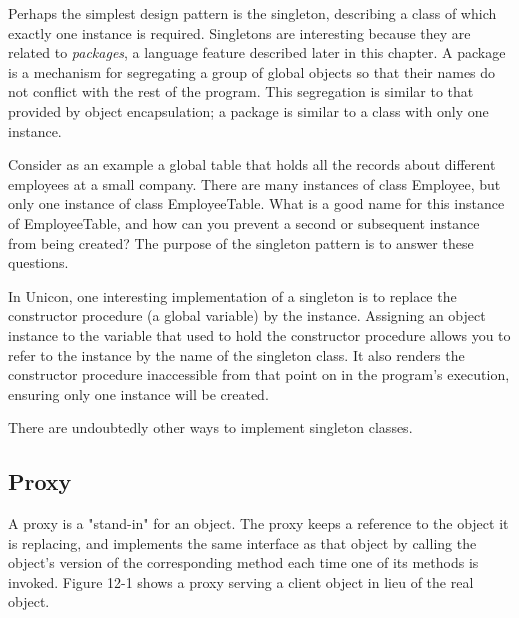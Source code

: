 Perhaps the simplest design pattern is the singleton,
describing a class of which exactly one instance
is required. Singletons are interesting because they are related to
\textit{packages}, a language feature described later in this chapter.
A package is a mechanism for segregating a group of
global objects so that their names do not conflict with the rest of the
program. This segregation is similar to that provided by object
encapsulation; a package is similar to a class with only one instance.

Consider as an example a global table that holds all the records about
different employees at a small company. There are many instances of
class \textsf{Employee}, but only one instance of class
\textsf{EmployeeTable}. What is a good name for this instance of
\textsf{EmployeeTable}, and how can you prevent a second or subsequent
instance from being created? The purpose of the singleton pattern is to
answer these questions. 

In Unicon, one interesting implementation of a singleton is to replace
the constructor procedure (a global variable)
by the instance. Assigning an object instance to the variable that used
to hold the constructor procedure allows you to refer to the instance
by the name of the singleton class. It also renders the constructor
procedure inaccessible from that point on in the
program's execution, ensuring only one instance will
be created.


\noindent
There are undoubtedly other ways to implement singleton classes.

\subsection*{Proxy}

A proxy is a "stand-in"
for an object. The proxy keeps a reference to the
object it is replacing, and implements the same interface as that
object by calling the object's version of the
corresponding method each time one of its methods is invoked. Figure
12-1 shows a proxy serving a client object in lieu of the real object.

\bigskip

